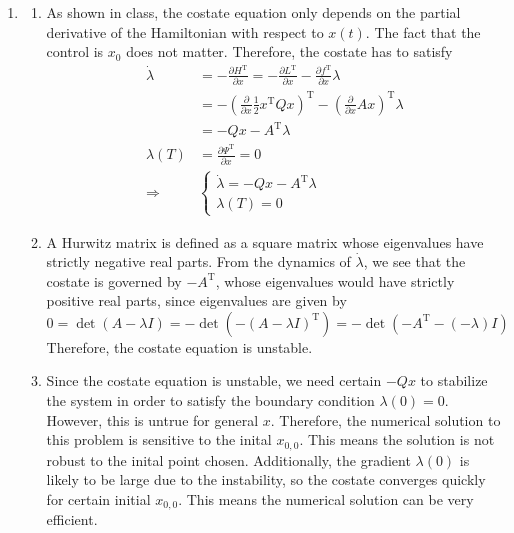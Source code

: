 \documentclass[letterpaper,11pt,titlepage]{article}
\newcommand{\trans}{^\text{T}}
\newcommand*\pder[2]{\frac{\partial #1}{\partial #2}}
\begin{document}
\begin{enumerate}[leftmargin=0pt]
\item \begin{enumerate}
  \item As shown in class, the costate equation only depends on the partial derivative of the Hamiltonian with respect to $x(t)$. The fact that the control is $x_0$ does not matter. Therefore, the costate has to satisfy
    \begin{align}
      \dot\lambda &= -\pder{H\trans}{x} = -\pder{L\trans}{x} - \pder{f\trans}{x} \lambda \\
                  &= - \left( \pder{}{x} \frac{1}{2} x\trans Qx \right)\trans - \left( \pder{}{x} Ax \right)\trans \lambda \\
                  &= - Qx - A\trans \lambda \\
      \lambda(T) &= \pder{\Psi\trans}{x} = 0 \\
      \Longrightarrow & \begin{cases}
        \dot\lambda =  -Qx - A\trans \lambda \\
        \lambda(T) = 0
      \end{cases}
    \end{align}
  \item A Hurwitz matrix is defined as a square matrix whose eigenvalues have strictly negative real parts. From the dynamics of $\dot\lambda$, we see that the costate is governed by $-A\trans$, whose eigenvalues would have strictly positive real parts, since eigenvalues are given by
    \[
      0 = \det(A-\lambda I) = -\det(-(A-\lambda I)\trans) = -\det(-A\trans-(-\lambda)I)
    \]
    Therefore, the costate equation is unstable.
  \item Since the costate equation is unstable, we need certain $-Qx$ to stabilize the system in order to satisfy the boundary condition $\lambda(0)=0$. However, this is untrue for general $x$. Therefore, the numerical solution to this problem is sensitive to the inital $x_{0,0}$. This means the solution is not robust to the inital point chosen. Additionally, the gradient $\lambda(0)$ is likely to be large due to the instability, so the costate converges quickly for certain initial $x_{0,0}$. This means the numerical solution can be very efficient.
  \end{enumerate}


\end{enumerate}
\end{document}
